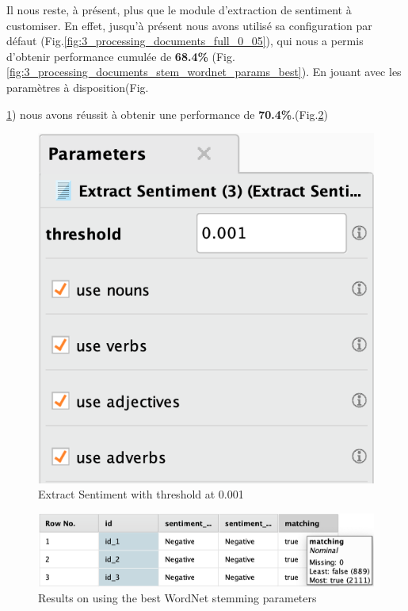 \documentclass[a4paper]{article}
\begin{document}
Il nous reste, à présent, plus que le module d'extraction de sentiment à customiser. En effet, jusqu'à présent nous avons utilisé sa configuration par défaut (Fig.\ref{fig:3_processing_documents_full_0_05}), qui nous a permis d'obtenir performance cumulée de \textbf{68.4\%} (Fig.\ref{fig:3_processing_documents_stem_wordnet_params_best}). En jouant avec les paramètres à disposition(Fig.{\ref{fig:3_processing_documents_full_0_001}) nous avons réussit à obtenir une performance de \textbf{70.4\%}.(Fig.\ref{fig:3_processing_documents_full_best_results})

\begin{figure}[H]
\centering
	\includegraphics[width=\linewidth/3]{imgs/part_3/3_processing_documents_full_0_001}
	\caption{Extract Sentiment with threshold at 0.001}
	\label{fig:3_processing_documents_full_0_001}
\end{figure}
\begin{figure}[H]
	\includegraphics[width=\linewidth]{imgs/part_3/3_processing_documents_full_best_results}
	\caption{Results on using the best WordNet stemming parameters}
	\label{fig:3_processing_documents_full_best_results}
\end{figure}

}
\end{document}
